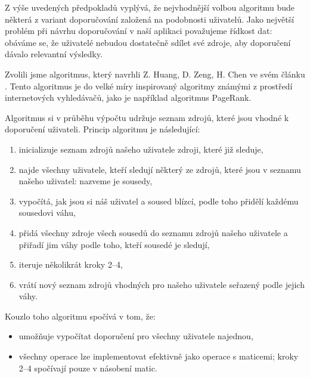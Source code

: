 Z výše uvedených předpokladů vyplývá, že nejvhodnější volbou algoritmu bude některá z variant doporučování založená na podobnosti uživatelů.
Jako největší problém při návrhu doporučování v naší aplikaci považujeme řídkost dat: obáváme se, že uživatelé nebudou dostatečně sdílet své zdroje, aby doporučení dávalo relevantní výsledky.

Zvolili jsme algoritmus, který navrhli Z. Huang, D. Zeng, H. Chen ve svém článku \cite{huang2004link}.
Tento algoritmus je do velké míry inspirovaný algoritmy známými z prostředí internetových vyhledávačů, jako je například algoritmus PageRank.

Algoritmus si v průběhu výpočtu udržuje seznam zdrojů, které jsou vhodné k doporučení uživateli.
Princip algoritmu je následující:
\begin{enumerate}
    \item inicializuje seznam zdrojů našeho uživatele zdroji, které již sleduje,
    \item najde všechny uživatele, kteří sledují některý ze zdrojů, které jsou v seznamu našeho uživatel: nazveme je sousedy,
    \item vypočítá, jak jsou si náš uživatel a soused blízcí, podle toho přidělí každému sousedovi váhu,
    \item přidá všechny zdroje všech sousedů do seznamu zdrojů našeho uživatele a přiřadí jim váhy podle toho, kteří sousedé je sledují,
    \item iteruje několikrát kroky 2--4,
    \item vrátí nový seznam zdrojů vhodných pro našeho uživatele seřazený podle jejich váhy.
\end{enumerate}

Kouzlo toho algoritmu spočívá v tom, že:
\begin{itemize}
    \item umožňuje vypočítat doporučení pro všechny uživatele najednou,
    \item všechny operace lze implementovat efektivně jako operace s maticemi; kroky 2--4 spočívají pouze v násobení matic.
\end{itemize}

